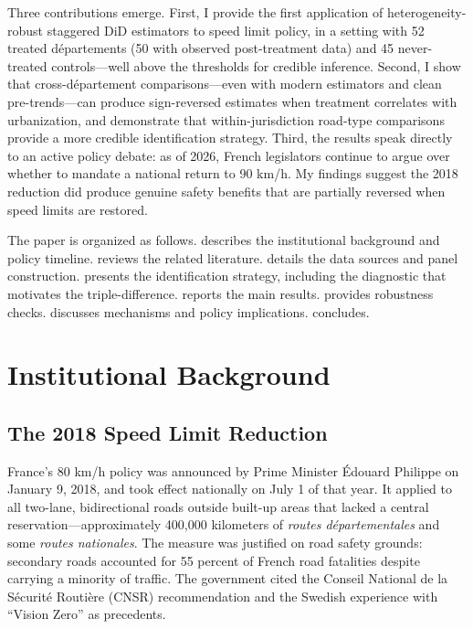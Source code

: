 \documentclass[12pt]{article}
\begin{document}
Three contributions emerge. First, I provide the first application of heterogeneity-robust staggered DiD estimators \citep{callaway2021} to speed limit policy, in a setting with 52 treated d\'{e}partements (50 with observed post-treatment data) and 45 never-treated controls---well above the thresholds for credible inference. Second, I show that cross-d\'{e}partement comparisons---even with modern estimators and clean pre-trends---can produce sign-reversed estimates when treatment correlates with urbanization, and demonstrate that within-jurisdiction road-type comparisons provide a more credible identification strategy. Third, the results speak directly to an active policy debate: as of 2026, French legislators continue to argue over whether to mandate a national return to 90 km/h. My findings suggest the 2018 reduction did produce genuine safety benefits that are partially reversed when speed limits are restored.

The paper is organized as follows.  describes the institutional background and policy timeline.  reviews the related literature.  details the data sources and panel construction.  presents the identification strategy, including the diagnostic that motivates the triple-difference.  reports the main results.  provides robustness checks.  discusses mechanisms and policy implications.  concludes.


\section{Institutional Background} \label{sec:background}

\subsection{The 2018 Speed Limit Reduction}

France's 80 km/h policy was announced by Prime Minister \'{E}douard Philippe on January 9, 2018, and took effect nationally on July 1 of that year. It applied to all two-lane, bidirectional roads outside built-up areas that lacked a central reservation---approximately 400,000 kilometers of \textit{routes d\'{e}partementales} and some \textit{routes nationales}. The measure was justified on road safety grounds: secondary roads accounted for 55 percent of French road fatalities despite carrying a minority of traffic. The government cited the Conseil National de la S\'{e}curit\'{e} Routi\`{e}re (CNSR) recommendation and the Swedish experience with ``Vision Zero'' as precedents.
\end{document}
